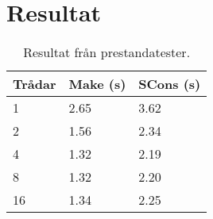 \section{Resultat}
\begin{table}[h!]
  \centering
  \begin{tabular}{|l|l|l|}
    \hline
    \textbf{Trådar} & \textbf{Make} (s) & \textbf{SCons} (s) \\ \hline
    1 & 2.65 & 3.62 \\ \hline
    2 & 1.56 & 2.34 \\ \hline
    4 & 1.32 & 2.19 \\ \hline
    8 & 1.32 & 2.20 \\ \hline
    16 & 1.34 & 2.25 \\ \hline
  \end{tabular}
  \caption{Resultat från prestandatester.}
  \label{tabell:konfig}
\end{table}
